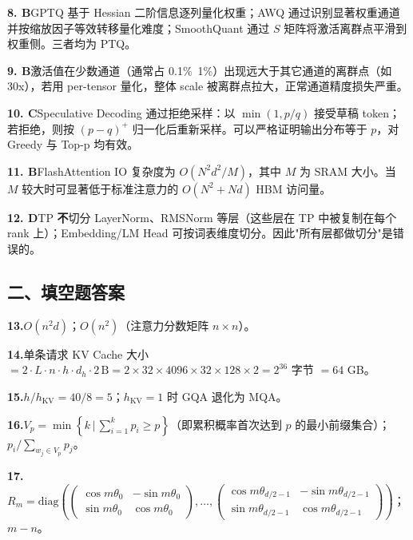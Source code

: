 \documentclass[11pt,a4paper]{article}
\begin{document}
\noindent\textbf{8. B}\quad GPTQ 基于 Hessian 二阶信息逐列量化权重；AWQ 通过识别显著权重通道并按缩放因子等效转移量化难度；SmoothQuant 通过 $S$ 矩阵将激活离群点平滑到权重侧。三者均为 PTQ。

\noindent\textbf{9. B}\quad 激活值在少数通道（通常占 0.1\%~1\%）出现远大于其它通道的离群点（如 30x），若用 per-tensor 量化，整体 scale 被离群点拉大，正常通道精度损失严重。

\noindent\textbf{10. C}\quad Speculative Decoding 通过拒绝采样：以 $\min(1, p/q)$ 接受草稿 token；若拒绝，则按 $(p-q)^+$ 归一化后重新采样。可以严格证明输出分布等于 $p$，对 Greedy 与 Top-p 均有效。

\noindent\textbf{11. B}\quad FlashAttention IO 复杂度为 $O(N^2 d^2 / M)$，其中 $M$ 为 SRAM 大小。当 $M$ 较大时可显著低于标准注意力的 $O(N^2 + N d)$ HBM 访问量。

\noindent\textbf{12. D}\quad TP \textbf{不}切分 LayerNorm、RMSNorm 等层（这些层在 TP 中被复制在每个 rank 上）；Embedding/LM Head 可按词表维度切分。因此"所有层都做切分"是错误的。

\subsection*{\heiti 二、填空题答案}

\noindent\textbf{13.}\quad $O(n^2 d)$\quad ；\quad $O(n^2)$（注意力分数矩阵 $n\times n$）。

\noindent\textbf{14.}\quad 单条请求 KV Cache 大小 $=2\cdot L \cdot n \cdot h \cdot d_h \cdot 2\,\text{B} = 2\times 32\times 4096\times 32\times 128\times 2 = 2^{36}$ 字节 $=64$ GB。

\noindent\textbf{15.}\quad $h/h_{\mathrm{KV}}=40/8=5$\quad ；\quad $h_{\mathrm{KV}}=1$ 时 GQA 退化为 MQA。

\noindent\textbf{16.}\quad $V_p=\min\left\{k\,\big|\,\sum_{i=1}^{k}p_i\geq p\right\}$（即累积概率首次达到 $p$ 的最小前缀集合）\quad ；\quad $p_i / \sum_{w_j\in V_p}p_j$。

\noindent\textbf{17.}\quad $R_m=\mathrm{diag}\!\left(\begin{pmatrix}\cos m\theta_0&-\sin m\theta_0\\\sin m\theta_0&\cos m\theta_0\end{pmatrix},\dots,\begin{pmatrix}\cos m\theta_{d/2-1}&-\sin m\theta_{d/2-1}\\\sin m\theta_{d/2-1}&\cos m\theta_{d/2-1}\end{pmatrix}\right)$\quad ；\quad $m-n$。
\end{document}
